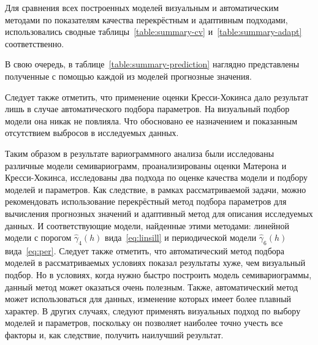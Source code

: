 Для сравнения всех построенных моделей визуальным и автоматическим методами по показателям качества перекрёстным и адаптивным подходами, использовались сводные таблицы~\ref{table:summary-cv} и~\ref{table:summary-adapt} соответственно.




\pagebreak

В свою очередь, в таблице~\ref{table:summary-prediction} наглядно представлены полученные с помощью каждой из моделей прогнозные значения.


Следует также отметить, что применение оценки Кресси-Хокинса дало результат лишь в случае автоматического подбора параметров. На визуальный подбор модели она никак не повлияла. Что обосновано ее назначением и показанным отсутствием выбросов в исследуемых данных.

Таким образом в результате вариограммного анализа были исследованы различные модели семивариограмм, проанализированы оценки Матерона и Кресси-Хокинса, исследованы два подхода по оценке качества модели и подбору моделей и параметров. Как следствие, в рамках рассматриваемой задачи, можно рекомендовать использование перекрёстный метод подбора параметров  для вычисления прогнозных значений и адаптивный метод для описания исследуемых данных. И соответствующие модели, найденные этими методами: линейной модели с порогом $ \widehat{\gamma}_4(h) $ вида~\eqref{eq:linsill} и периодической модели $ \widehat{\gamma}_6(h) $ вида~\eqref{eq:per}. Следует также отметить, что автоматический метод подбора моделей в рассматриваемых условиях показал результаты хуже, чем визуальный подбор. Но в условиях, когда нужно быстро построить модель семивариограммы, данный метод может оказаться очень полезным. Также, автоматический метод может использоваться для данных, изменение которых имеет более плавный характер. В других случаях, следуют применять визуальных подход по выбору моделей и параметров, поскольку он позволяет наиболее точно учесть все факторы и, как следствие, получить наилучший результат.


